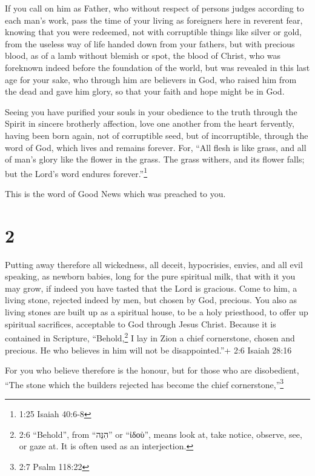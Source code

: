  If you call on him as Father, who without respect of
persons judges according to each man's work, pass the time of your
living as foreigners here in reverent fear,  knowing that
you were redeemed, not with corruptible things like silver or gold, from
the useless way of life handed down from your fathers,  but
with precious blood, as of a lamb without blemish or spot, the blood of
Christ,  who was foreknown indeed before the foundation of
the world, but was revealed in this last age for your sake,
 who through him are believers in God, who raised him from
the dead and gave him glory, so that your faith and hope might be in
God.

 Seeing you have purified your souls in your obedience to
the truth through the Spirit in sincere brotherly affection, love one
another from the heart fervently,  having been born again,
not of corruptible seed, but of incorruptible, through the word of God,
which lives and remains forever.  For, ``All flesh is like
grass, and all of man's glory like the flower in the grass. The grass
withers, and its flower falls;  but the Lord's word endures
forever.''\footnote{1:25 Isaiah 40:6-8}

This is the word of Good News which was preached to you.

\hypertarget{section-1}{%
\section{2}\label{section-1}}

 Putting away therefore all wickedness, all deceit,
hypocrisies, envies, and all evil speaking,  as newborn
babies, long for the pure spiritual milk, that with it you may grow,
 if indeed you have tasted that the Lord is gracious.
 Come to him, a living stone, rejected indeed by men, but
chosen by God, precious.  You also as living stones are
built up as a spiritual house, to be a holy priesthood, to offer up
spiritual sacrifices, acceptable to God through Jesus Christ.
 Because it is contained in Scripture, ``Behold,\footnote{2:6
  ``Behold'', from ``הִנֵּה'' or ``ἰδοὺ'', means look at, take notice,
  observe, see, or gaze at. It is often used as an interjection.} I lay
in Zion a chief cornerstone, chosen and precious. He who believes in him
will not be disappointed.''+ 2:6 Isaiah 28:16

 For you who believe therefore is the honour, but for those
who are disobedient, ``The stone which the builders rejected has become
the chief cornerstone,''\footnote{2:7 Psalm 118:22}


